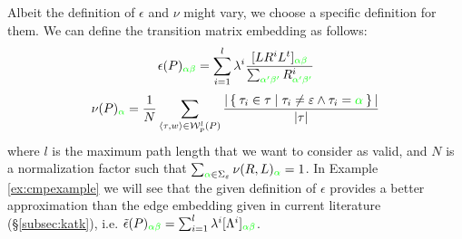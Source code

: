 Albeit the definition of $\epsilon$ and $\nu$ might vary, we choose a specific definition for them. 
We can define the transition matrix embedding as follows:
\begin{equation}\label{eq:epsilon}
\epsilon(P)_{\color{green}\alpha\beta}=\sum_{i=1}^l{\lambda^i}\frac{[LR^iL^t]_{\color{green}\alpha\beta}}{\sum_{\color{green}\alpha'\beta'}R^i_{\color{green}\alpha'\beta'}}
%
\end{equation}
\begin{equation}\label{eq:nu}
\nu(P)_{\color{green}\alpha}=\frac{1}{N}\sum_{\braket{\tau,w}\in\mathcal{W}_p^l(P)}\frac{|\Set{\tau_i\in\tau|\tau_i\neq\varepsilon\wedge \tau_i={\color{green}\alpha}}|}{|\tau|}
\end{equation}
where $l$ is the maximum path length that we want to consider as valid, and $N$ is a normalization factor such that $\sum_{{\color{green}\alpha}\in\Sigma_\varepsilon}\nu(R,L)_{\color{green}\alpha}=1$. In Example \ref{ex:cmpexample} we will see that the given definition of $\epsilon$ provides a better approximation than the edge embedding given in current literature (\S\ref{subsec:katk}), i.e. $\tilde{\epsilon}(P)_{\color{green}\alpha\beta}=\sum_{i=1}^l\lambda^i[\Lambda^i]_{\color{green}\alpha\beta}$.



